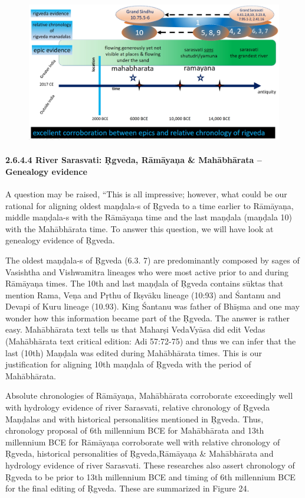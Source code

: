 \begin{figure}[!htbp]
\includegraphics[scale=0.21]{"images/8-23.jpg"}
\caption{}\label{art8-fig23}
\end{figure}


\paragraph*{2.6.4.4 River Sarasvati: Ṛgveda, Rāmāyaņa \& Mahābhārata – Genealogy evidence}

A question may be raised, “This is all impressive; however, what could be our rational for aligning oldest maņḍala-s of Ṛgveda to a time earlier to Rāmāyaņa, middle maņḍala-s with the Rāmāyaņa time and the last maņḍala (maņḍala 10) with the Mahābhārata time. To answer this question, we will have look at genealogy evidence of Ṛgveda.

The oldest maņḍala-s of Ṛgveda (6.3. 7) are predominantly composed by sages of Vasishtha and Vishwamitra lineages who were most active prior to and during Rāmāyaņa times. The 10th and last maņḍala of Ṛgveda contains sūktas that mention Rama, Veņa and Pŗthu of Ikṣvāku lineage (10:93) and Śantanu and Devapi of Kuru lineage (10.93). King Śantanu was father of Bhīṣma and one may wonder how this information became part of the Ṛgveda. The answer is rather easy. Mahābhārata text tells us that Maharṣi VedaVyāsa did edit Vedas (Mahābhārata text critical edition: Adi 57:72-75) and thus we can infer that the last (10th) Maņḍala was edited during Mahābhārata times. This is our justification for aligning 10th maņḍala of Ṛgveda with the period of Mahābhārata.

Absolute chronologies of Rāmāyaņa, Mahābhārata corroborate exceedingly well with hydrology evidence of river Sarasvati, relative chronology of Ṛgveda Maņḍalas and with historical personalities mentioned in Ṛgveda. Thus, chronology proposal of 6th millennium BCE for Mahābhārata and 13th millennium BCE for Rāmāyaņa corroborate well with relative chronology of Ṛgveda, historical personalities of Ṛgveda,\break Rāmāyaņa \& Mahābhārata and hydrology evidence of river Sarasvati. These researches also assert chronology of Ṛgveda to be prior to 13th millennium BCE and timing of 6th millennium BCE for the final editing of Ṛgveda. These are summarized in Figure 24.

